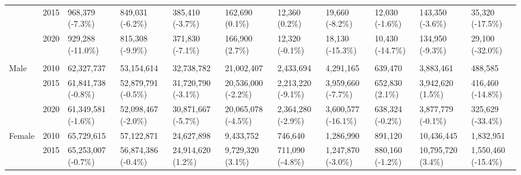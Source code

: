 \documentclass[a4paper,12pt]{article}
\begin{document}
\begin{table}[htbp]
{\begin{tabular}{lllllllllll}
 & 2015 & 968,379 (-7.3\%) & 849,031 (-6.2\%) & \multicolumn{1}{l}{385,410 (-3.7\%)} & \multicolumn{1}{l}{162,690 (0.1\%)} & \multicolumn{1}{l}{12,360 (0.2\%)} & \multicolumn{1}{l}{19,660 (-8.2\%)} & \multicolumn{1}{l}{12,030 (-1.6\%)} & \multicolumn{1}{l}{143,350 (-3.6\%)} & \multicolumn{1}{l}{35,320 (-17.5\%)} \\
 & 2020 & 929,288 (-11.0\%) & 815,308 (-9.9\%) & \multicolumn{1}{l}{371,830 (-7.1\%)} & \multicolumn{1}{l}{166,900 (2.7\%)} & \multicolumn{1}{l}{12,320 (-0.1\%)} & \multicolumn{1}{l}{18,130 (-15.3\%)} & \multicolumn{1}{l}{10,430 (-14.7\%)} & \multicolumn{1}{l}{134,950 (-9.3\%)} & \multicolumn{1}{l}{29,100 (-32.0\%)} \\
\hline
\addlinespace[0.5em]
\multicolumn{11}{l}{\textbf{Nationwide}} \\
\addlinespace[0.5em]
Male & 2010 & 62,327,737 & 53,154,614 & \multicolumn{1}{l}{32,738,782} & \multicolumn{1}{l}{21,002,407} & \multicolumn{1}{l}{2,433,694} & \multicolumn{1}{l}{4,291,165} & \multicolumn{1}{l}{639,470} & \multicolumn{1}{l}{3,883,461} & \multicolumn{1}{l}{488,585} \\
 & 2015 & 61,841,738 (-0.8\%) & 52,879,791 (-0.5\%) & \multicolumn{1}{l}{31,720,790 (-3.1\%)} & \multicolumn{1}{l}{20,536,000 (-2.2\%)} & \multicolumn{1}{l}{2,213,220 (-9.1\%)} & \multicolumn{1}{l}{3,959,660 (-7.7\%)} & \multicolumn{1}{l}{652,830 (2.1\%)} & \multicolumn{1}{l}{3,942,620 (1.5\%)} & \multicolumn{1}{l}{416,460 (-14.8\%)} \\
 & 2020 & 61,349,581 (-1.6\%) & 52,098,467 (-2.0\%) & \multicolumn{1}{l}{30,871,667 (-5.7\%)} & \multicolumn{1}{l}{20,065,078 (-4.5\%)} & \multicolumn{1}{l}{2,364,280 (-2.9\%)} & \multicolumn{1}{l}{3,600,577 (-16.1\%)} & \multicolumn{1}{l}{638,324 (-0.2\%)} & \multicolumn{1}{l}{3,877,779 (-0.1\%)} & \multicolumn{1}{l}{325,629 (-33.4\%)} \\
\addlinespace[0.3em]
Female & 2010 & 65,729,615 & 57,122,871 & \multicolumn{1}{l}{24,627,898} & \multicolumn{1}{l}{9,433,752} & \multicolumn{1}{l}{746,640} & \multicolumn{1}{l}{1,286,990} & \multicolumn{1}{l}{891,120} & \multicolumn{1}{l}{10,436,445} & \multicolumn{1}{l}{1,832,951} \\
 & 2015 & 65,253,007 (-0.7\%) & 56,874,386 (-0.4\%) & \multicolumn{1}{l}{24,914,620 (1.2\%)} & \multicolumn{1}{l}{9,729,320 (3.1\%)} & \multicolumn{1}{l}{711,090 (-4.8\%)} & \multicolumn{1}{l}{1,247,870 (-3.0\%)} & \multicolumn{1}{l}{880,160 (-1.2\%)} & \multicolumn{1}{l}{10,795,720 (3.4\%)} & \multicolumn{1}{l}{1,550,460 (-15.4\%)} \\

\end{tabular}}
\end{table}
\end{document}
